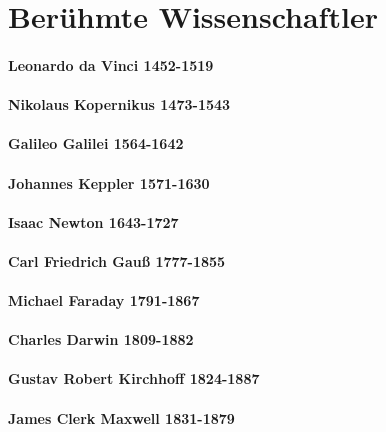 \part{Berühmte Wissenschaftler}
\subsection{Leonardo da Vinci 			1452-1519}
\subsection{Nikolaus Kopernikus 		1473-1543}
\subsection{Galileo Galilei 			1564-1642}
\subsection{Johannes Keppler 			1571-1630}
\subsection{Isaac Newton 				1643-1727}
\subsection{Carl Friedrich Gauß 		1777-1855}
\subsection{Michael Faraday 			1791-1867}
\subsection{Charles Darwin 			1809-1882}
\subsection{Gustav Robert Kirchhoff    1824-1887}
\subsection{James Clerk Maxwell 		1831-1879}
